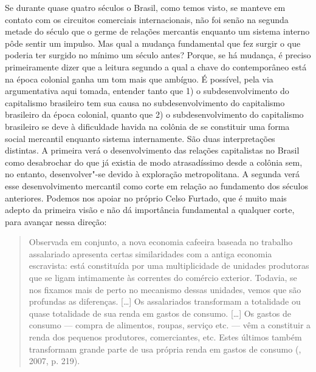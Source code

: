 Se durante quase quatro séculos o Brasil, como temos visto, se manteve
em contato com os circuitos comerciais internacionais, não foi senão na
segunda metade do século  que o germe de relações mercantis enquanto
um sistema interno pôde sentir um impulso. Mas qual a mudança
fundamental que fez surgir o que poderia ter surgido no mínimo um século
antes? Porque, se há mudança, é preciso primeiramente dizer que a
leitura segundo a qual a chave do contemporâneo está na época colonial
ganha um tom mais que ambíguo. É possível, pela via argumentativa aqui
tomada, entender tanto que 1) o subdesenvolvimento do capitalismo
brasileiro tem sua causa no subdesenvolvimento do capitalismo brasileiro
da época colonial, quanto que 2) o subdesenvolvimento do capitalismo
brasileiro se deve à dificuldade havida na colônia de se constituir uma
forma social mercantil enquanto sistema internamente. São duas
interpretações distintas. A primeira verá o desenvolvimento das relações
capitalistas no Brasil como desabrochar do que já existia de modo
atrasadíssimo desde a colônia sem, no entanto, desenvolver"-se devido à
exploração metropolitana. A segunda verá esse desenvolvimento mercantil
como corte em relação ao fundamento dos séculos anteriores. Podemos nos
apoiar no próprio Celso Furtado, que é muito mais adepto da primeira visão e
não dá importância fundamental a qualquer corte, para avançar nessa
direção:

\begin{quote}
Observada em conjunto, a nova economia cafeeira baseada no trabalho
assalariado apresenta certas similaridades com a antiga economia
escravista: está constituída por uma multiplicidade de unidades
produtoras que se ligam intimamente às correntes do comércio exterior.
Todavia, se nos fixamos mais de perto no mecanismo dessas unidades,
vemos que são profundas as diferenças. [\ldots{}] Os assalariados
transformam a totalidade ou quase totalidade de sua renda em gastos de
consumo. [\ldots{}] Os gastos de consumo --- compra de alimentos, roupas,
serviço etc. --- vêm a constituir a renda dos pequenos produtores,
comerciantes, etc. Estes últimos também transformam grande parte de usa
própria renda em gastos de consumo (, 2007, p. 219).
\end{quote}

